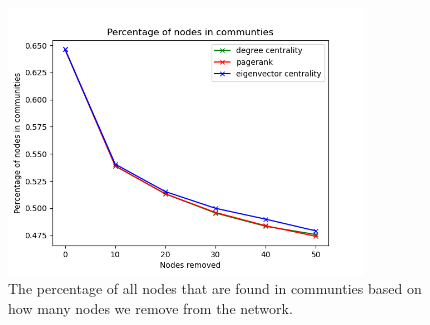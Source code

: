 \documentclass[9pt,twocolumn,twoside]{pnas-new}
\begin{document}
\begin{figure}[h!]
    \centering
    \includegraphics[width=1\linewidth,height=200pt]{ratio.png}
    \caption{The percentage of all nodes that are found in communties based on how many nodes we remove from the network.}
    \label{lab1}
\end{figure}



\end{document}
